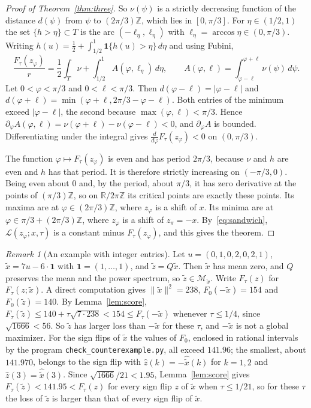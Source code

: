 \documentclass[11pt]{article}
\theoremstyle{remark}
\newtheorem{remark}[theorem]{Remark}
\newcommand{\R}{\mathbb{R}}
\newcommand{\Z}{\mathbb{Z}}
\begin{document}
\begin{proof}[Proof of Theorem~\ref{thm:three}]
So $\nu(\psi)$ is a strictly decreasing function of the distance $d(\psi)$ from $\psi$ to $(2\pi/3)\Z$, which lies in $[0,\pi/3]$. For $\eta\in(1/2,1)$ the set $\{h>\eta\}\subset T$ is the arc $(-\ell_\eta,\ell_\eta)$ with $\ell_\eta=\arccos\eta\in(0,\pi/3)$. Writing $h(u)=\frac12+\int_{1/2}^1\mathbf 1\{h(u)>\eta\}\,d\eta$ and using Fubini,
\[
\frac{F_\tau(z_\varphi)}{r}=\frac12\int_T\nu+\int_{1/2}^1A(\varphi,\ell_\eta)\,d\eta,\qquad A(\varphi,\ell)=\int_{\varphi-\ell}^{\varphi+\ell}\nu(\psi)\,d\psi .
\]
Let $0<\varphi<\pi/3$ and $0<\ell<\pi/3$. Then $d(\varphi-\ell)=|\varphi-\ell|$ and $d(\varphi+\ell)=\min(\varphi+\ell,2\pi/3-\varphi-\ell)$. Both entries of the minimum exceed $|\varphi-\ell|$, the second because $\max(\varphi,\ell)<\pi/3$. Hence $\partial_\varphi A(\varphi,\ell)=\nu(\varphi+\ell)-\nu(\varphi-\ell)<0$, and $\partial_\varphi A$ is bounded. Differentiating under the integral gives $\frac{d}{d\varphi}F_\tau(z_\varphi)<0$ on $(0,\pi/3)$.

The function $\varphi\mapsto F_\tau(z_\varphi)$ is even and has period $2\pi/3$, because $\nu$ and $h$ are even and $h$ has that period. It is therefore strictly increasing on $(-\pi/3,0)$. Being even about $0$ and, by the period, about $\pi/3$, it has zero derivative at the points of $(\pi/3)\Z$, so on $\R/2\pi\Z$ its critical points are exactly these points. Its maxima are at $\varphi\in(2\pi/3)\Z$, where $z_\varphi$ is a shift of $x$. Its minima are at $\varphi\in\pi/3+(2\pi/3)\Z$, where $z_\varphi$ is a shift of $z_\pi=-x$. By~\eqref{eq:sandwich}, $\mathcal L(z_\varphi;x,\tau)$ is a constant minus $F_\tau(z_\varphi)$, and this gives the theorem.
\end{proof}

\begin{remark}[An example with integer entries]\label{rem:integer}
Let $u=(0,1,0,2,0,2,1)$, $\tilde x=7u-6\cdot\mathbf 1$ with $\mathbf 1=(1,\dots,1)$, and $\tilde z=Q\tilde x$. Then $\tilde x$ has mean zero, and $Q$ preserves the mean and the power spectrum, so $\tilde z\in\mathcal M_{\tilde x}$. Write $F_\tau(z)$ for $F_\tau(z;\tilde x)$. A direct computation gives $\|\tilde x\|^2=238$, $F_0(-\tilde x)=154$ and $F_0(\tilde z)=140$. By Lemma~\ref{lem:score}, $F_\tau(\tilde z)\le 140+\tau\sqrt{7\cdot238}<154\le F_\tau(-\tilde x)$ whenever $\tau\le1/4$, since $\sqrt{1666}<56$. So $\tilde z$ has larger loss than $-\tilde x$ for these $\tau$, and $-\tilde x$ is not a global maximizer. For the sign flips of $\tilde x$ the values of $F_0$, enclosed in rational intervals by the program \texttt{check\_counterexample.py}, all exceed $141.96$; the smallest, about $141.970$, belongs to the sign flip with $\widehat z(k)=-\widehat{\tilde x}(k)$ for $k=1,2$ and $\widehat z(3)=\widehat{\tilde x}(3)$. Since $\sqrt{1666}/21<1.95$, Lemma~\ref{lem:score} gives $F_\tau(\tilde z)<141.95<F_\tau(z)$ for every sign flip $z$ of $\tilde x$ when $\tau\le1/21$, so for these $\tau$ the loss of $\tilde z$ is larger than that of every sign flip of $\tilde x$.
\end{remark}
\end{document}
